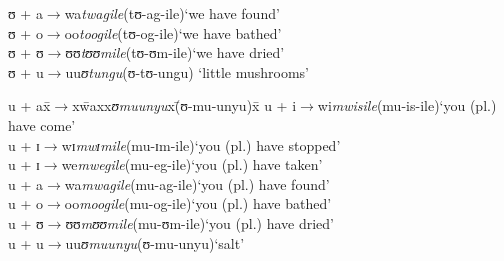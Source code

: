 \begin{exe}
\begin{tabbing}
		ʊ + a\>$\rightarrow$\>wa\>\textit{twagile}\>(\degree tʊ-ag-ile)\>`we have found'\\
		ʊ + o\>$\rightarrow$\>oo\>\textit{toogile}\>(\degree tʊ-og-ile)\>`we have bathed' \\
		ʊ + ʊ\>$\rightarrow$\>ʊʊ\>\textit{tʊʊmile}\>(\degree tʊ-ʊm-ile)\>`we have dried'\\
		ʊ + u\>$\rightarrow$\>uu\>\textit{ʊtungu}\>(\degree ʊ-tʊ-ungu) \> \lq little mushrooms' %
	\end{tabbing}
	\ex\label{exVowelContactu}\begin{tabbing}
		u + ax\=$\rightarrow$x\=waxx\=\textit{ʊmuunyu}x\=(\degree ʊ-mu-unyu)x\=\kill%
		u + i\>$\rightarrow$\>wi\>\textit{mwisile}\>(\degree mu-is-ile)\>`you (pl.) have come'\\
		u + ɪ\>$\rightarrow$\>wɪ\>\textit{mwɪmile}\>(\degree mu-ɪm-ile)\>`you (pl.) have stopped'\\
		u + ɪ\>$\rightarrow$\>we\>\textit{mwegile}\>(\degree mu-eg-ile)\>`you (pl.) have taken'\\
		u + a\>$\rightarrow$\>wa\>\textit{mwagile}\>(\degree mu-ag-ile)\>`you (pl.) have found'\\
		u + o\>$\rightarrow$\>oo\>\textit{moogile}\>(\degree mu-og-ile)\>`you (pl.) have bathed' \\
		u + ʊ\>$\rightarrow$\>ʊʊ\>\textit{mʊʊmile}\>(\degree mu-ʊm-ile)\>`you (pl.) have dried'\\
		u + u\>$\rightarrow$\>uu\>\textit{ʊmuunyu}\>(\degree ʊ-mu-unyu)\>`salt'
	\end{tabbing}
\end{exe}

